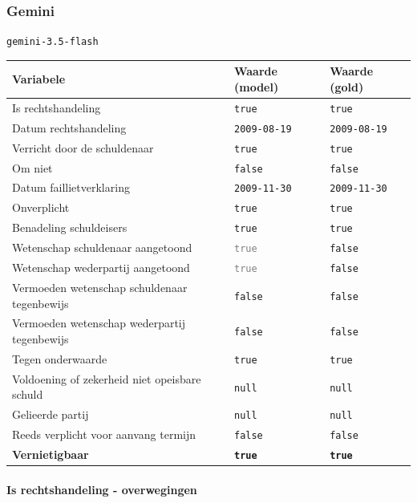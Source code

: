 \documentclass[
  dutch,
  a4paper,
]{article}
\begin{document}
\newpage


\subsubsection{Gemini}\label{gemini-22}

\texttt{gemini-3.5-flash}

\begin{center}
\small
\begin{tabular}{@{}p{7.4cm}p{2.6cm}p{2.6cm}@{}}
\toprule
Variabele & Waarde (model) & Waarde (gold) \\
\midrule
Is rechtshandeling & \texttt{true} & \texttt{true} \\
Datum rechtshandeling & \texttt{2009-08-19} & \texttt{2009-08-19} \\
Verricht door de schuldenaar & \texttt{true} & \texttt{true} \\
Om niet & \texttt{false} & \texttt{false} \\
Datum faillietverklaring & \texttt{2009-11-30} & \texttt{2009-11-30} \\
Onverplicht & \texttt{true} & \texttt{true} \\
Benadeling schuldeisers & \texttt{true} & \texttt{true} \\
Wetenschap schuldenaar aangetoond & \textcolor{gray}{\texttt{true}} & \texttt{false} \\
Wetenschap wederpartij aangetoond & \textcolor{gray}{\texttt{true}} & \texttt{false} \\
Vermoeden wetenschap schuldenaar tegenbewijs & \texttt{false} & \texttt{false} \\
Vermoeden wetenschap wederpartij tegenbewijs & \texttt{false} & \texttt{false} \\
Tegen onderwaarde & \texttt{true} & \texttt{true} \\
Voldoening of zekerheid niet opeisbare schuld & \texttt{null} & \texttt{null} \\
Gelieerde partij & \texttt{null} & \texttt{null} \\
Reeds verplicht voor aanvang termijn & \texttt{false} & \texttt{false} \\
\textbf{Vernietigbaar} & \textbf{\texttt{true}} & \textbf{\texttt{true}} \\
\bottomrule
\end{tabular}
\end{center}

\paragraph{Is rechtshandeling - overwegingen}\label{is-rechtshandeling---overwegingen-68}
\end{document}
